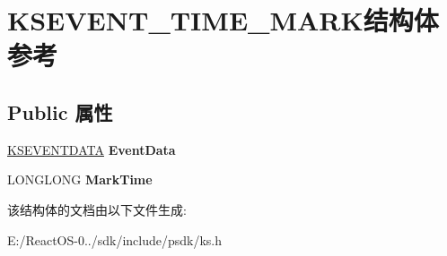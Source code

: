 \hypertarget{struct_k_s_e_v_e_n_t___t_i_m_e___m_a_r_k}{}\section{K\+S\+E\+V\+E\+N\+T\+\_\+\+T\+I\+M\+E\+\_\+\+M\+A\+R\+K结构体 参考}
\label{struct_k_s_e_v_e_n_t___t_i_m_e___m_a_r_k}
\subsection*{Public 属性}
\begin{DoxyCompactItemize}
\item 
\mbox{\label{struct_k_s_e_v_e_n_t___t_i_m_e___m_a_r_k_ae0652789a2c0461bbfd466e49c0e0b08}} 
\hyperlink{struct_k_s_e_v_e_n_t_d_a_t_a}{K\+S\+E\+V\+E\+N\+T\+D\+A\+TA} {\bfseries Event\+Data}
\item 
\mbox{\label{struct_k_s_e_v_e_n_t___t_i_m_e___m_a_r_k_a99954f7ba2df2f168051a514bfb03b66}} 
L\+O\+N\+G\+L\+O\+NG {\bfseries Mark\+Time}
\end{DoxyCompactItemize}


该结构体的文档由以下文件生成\+:\begin{DoxyCompactItemize}
\item 
E\+:/\+React\+O\+S-\/0../sdk/include/psdk/ks.\+h\end{DoxyCompactItemize}
